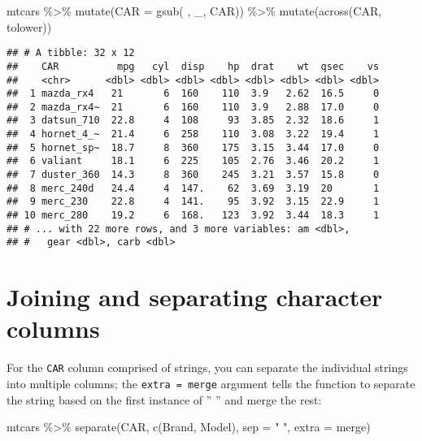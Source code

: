 \documentclass[
]{book}
\newenvironment{Shaded}{\begin{snugshade}}{\end{snugshade}}
\newcommand{\AttributeTok}[1]{\textcolor[rgb]{0.77,0.63,0.00}{#1}}
\newcommand{\FunctionTok}[1]{\textcolor[rgb]{0.00,0.00,0.00}{#1}}
\newcommand{\NormalTok}[1]{#1}
\newcommand{\SpecialCharTok}[1]{\textcolor[rgb]{0.00,0.00,0.00}{#1}}
\newcommand{\StringTok}[1]{\textcolor[rgb]{0.31,0.60,0.02}{#1}}
\begin{document}
\begin{Shaded}
\begin{Highlighting}[]
\NormalTok{mtcars }\SpecialCharTok{\%\textgreater{}\%} \FunctionTok{mutate}\NormalTok{(}\AttributeTok{CAR =} \FunctionTok{gsub}\NormalTok{(}\StringTok{\textquotesingle{} \textquotesingle{}}\NormalTok{, }\StringTok{\textquotesingle{}\_\textquotesingle{}}\NormalTok{, CAR)) }\SpecialCharTok{\%\textgreater{}\%} \FunctionTok{mutate}\NormalTok{(}\FunctionTok{across}\NormalTok{(CAR, tolower))}
\end{Highlighting}
\end{Shaded}

\begin{verbatim}
## # A tibble: 32 x 12
##    CAR          mpg   cyl  disp    hp  drat    wt  qsec    vs
##    <chr>      <dbl> <dbl> <dbl> <dbl> <dbl> <dbl> <dbl> <dbl>
##  1 mazda_rx4   21       6  160    110  3.9   2.62  16.5     0
##  2 mazda_rx4~  21       6  160    110  3.9   2.88  17.0     0
##  3 datsun_710  22.8     4  108     93  3.85  2.32  18.6     1
##  4 hornet_4_~  21.4     6  258    110  3.08  3.22  19.4     1
##  5 hornet_sp~  18.7     8  360    175  3.15  3.44  17.0     0
##  6 valiant     18.1     6  225    105  2.76  3.46  20.2     1
##  7 duster_360  14.3     8  360    245  3.21  3.57  15.8     0
##  8 merc_240d   24.4     4  147.    62  3.69  3.19  20       1
##  9 merc_230    22.8     4  141.    95  3.92  3.15  22.9     1
## 10 merc_280    19.2     6  168.   123  3.92  3.44  18.3     1
## # ... with 22 more rows, and 3 more variables: am <dbl>,
## #   gear <dbl>, carb <dbl>
\end{verbatim}

\hypertarget{joining-and-separating-character-columns}{%
\section{Joining and separating character columns}\label{joining-and-separating-character-columns}}

For the \texttt{CAR} column comprised of strings, you can separate the individual strings into multiple columns; the \texttt{extra\ =\ \textquotesingle{}merge\textquotesingle{}} argument tells the function to separate the string based on the first instance of '' '' and merge the rest:

\begin{Shaded}
\begin{Highlighting}[]
\NormalTok{mtcars }\SpecialCharTok{\%\textgreater{}\%} \FunctionTok{separate}\NormalTok{(CAR, }\FunctionTok{c}\NormalTok{(}\StringTok{\textquotesingle{}Brand\textquotesingle{}}\NormalTok{, }\StringTok{\textquotesingle{}Model\textquotesingle{}}\NormalTok{), }\AttributeTok{sep =} \StringTok{" "}\NormalTok{, }\AttributeTok{extra =} \StringTok{\textquotesingle{}merge\textquotesingle{}}\NormalTok{)}
\end{Highlighting}
\end{Shaded}
\end{document}

